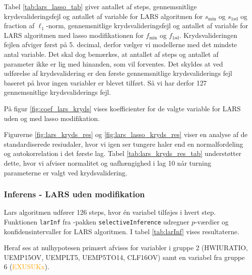 %
Tabel \ref{tab:lars_lasso_tab} giver antallet af steps, gennemsnitlige krydsvalideringsfejl og antallet af variable for LARS algoritmen for \(s_\text{min}\) og \(s_{1 \text{sd}}\) og fraction af \(\ell_1\)-norm, gennemsnitlige krydsvalideringsfejl og antallet af variable for LARS algoritmen med lasso modifikationen for \(f_\text{min}\) og \(f_{1 \text{sd}}\).
%
Krydsvalideringen fejlen afviger først på 5. decimal, derfor vælger vi modellerne med det mindste antal variable. 
Det skal dog bemærkes, at antallet af steps og antallet af parameter ikke er lig med hinanden, som vil forventes. 
Det skyldes at ved udførelse af krydsvalidering er den første gennemsnitlige krydsvaliderings fejl baseret på hvor ingen variabler er blevet tilført. 
Så vi har derfor 127 gennemsnitlige krydsvaliderings fejl. 
%

%
På figur \ref{fig:coef_lars_kryds} vises koefficienter for de valgte variable for LARS uden og med lasso modifikation.


Figurerne \ref{fig:lars_kryds_res} og  \ref{fig:lars_lasso_kryds_res} viser en analyse af de standardiserede resiudaler, hvor vi igen ser tungere haler end en normalfordeling og autokorrelation i det første lag. Tabel \ref{tab:lars_kryds_res_tab}  understøtter dette, hvor vi afviser normalitet og uafhængighed i lag 10 når turning parameterne er valgt ved krydsvalidering. 

\newpage
\subsubsection{Inferens - LARS uden modifikation}
Lars algoritmen udfører 126 steps, hvor én variabel tilføjes i hvert step.
Funktionen \texttt{larInf} fra \Rlang-pakken \texttt{selectiveInference} udregner \(p\)-værdier og konfidensintervaller for LARS algoritmen.
I tabel \ref{tab:larInf} vises resultaterne.
%

%
Heraf ses at nulhypotesen primært afvises for variabler i gruppe 2 (\textcolor{blue3}{HWIURATIO}, \textcolor{blue3}{UEMP15OV}, \textcolor{blue3}{UEMPLT5}, \textcolor{blue3}{UEMP5TO14}, \textcolor{blue3}{CLF16OV}) samt en variabel fra gruppe 6 (\textcolor{orange}{EXUSUKx}).

